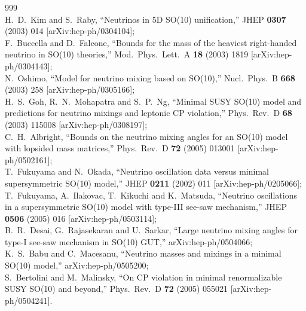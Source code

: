 \begin{thebibliography}{999}
\\
  H.~D.~Kim and S.~Raby,
  ``Neutrinos in 5D SO(10) unification,''
  JHEP {\bf 0307} (2003) 014
  [arXiv:hep-ph/0304104];
 \\ 
  F.~Buccella and D.~Falcone,
  ``Bounds for the mass of the heaviest right-handed neutrino in SO(10)
  theories,''
  Mod.\ Phys.\ Lett.\ A {\bf 18} (2003) 1819
  [arXiv:hep-ph/0304143];
\\
  N.~Oshimo,
  ``Model for neutrino mixing based on SO(10),''
  Nucl.\ Phys.\ B {\bf 668} (2003) 258
  [arXiv:hep-ph/0305166];
  \\
  H.~S.~Goh, R.~N.~Mohapatra and S.~P.~Ng,
  ``Minimal SUSY SO(10) model and predictions for neutrino mixings and
  leptonic CP violation,''
  Phys.\ Rev.\ D {\bf 68} (2003) 115008
  [arXiv:hep-ph/0308197];
  \\
  C.~H.~Albright,
  ``Bounds on the neutrino mixing angles for an SO(10) model with lopsided
  mass matrices,''
  Phys.\ Rev.\ D {\bf 72} (2005) 013001
  [arXiv:hep-ph/0502161];
\\
  T.~Fukuyama and N.~Okada,
  ``Neutrino oscillation data versus minimal supersymmetric SO(10) model,''
  JHEP {\bf 0211} (2002) 011
  [arXiv:hep-ph/0205066];
  T.~Fukuyama, A.~Ilakovac, T.~Kikuchi and K.~Matsuda,
  ``Neutrino oscillations in a supersymmetric SO(10) model with type-III
  see-saw mechanism,''
  JHEP {\bf 0506} (2005) 016
  [arXiv:hep-ph/0503114];
  \\
  B.~R.~Desai, G.~Rajasekaran and U.~Sarkar,
  ``Large neutrino mixing angles for type-I see-saw mechanism in SO(10) GUT,''
  arXiv:hep-ph/0504066;
  \\
  K.~S.~Babu and C.~Macesanu,
  ``Neutrino masses and mixings in a minimal SO(10) model,''
  arXiv:hep-ph/0505200;
\\
 S.~Bertolini and M.~Malinsky,
  ``On CP violation in minimal renormalizable SUSY SO(10) and beyond,''
  Phys.\ Rev.\ D {\bf 72} (2005) 055021
  [arXiv:hep-ph/0504241].


\end{thebibliography}
